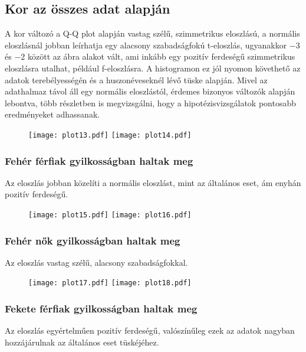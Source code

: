 \documentclass{article}
\begin{document}
\subsection{Kor az összes adat alapján}

A kor változó a Q-Q plot alapján vastag szélű, szimmetrikus eloszlású, a normális eloszlásnál jobban leírhatja egy alacsony szabadságfokú t-eloszlás, ugyanakkor $-3$ és $-2$ között az ábra alakot vált, ami inkább egy pozitív ferdeségű szimmetrikus eloszlásra utalhat, például f-eloszlásra. A histogramon ez jól nyomon követhető az adatok terebélyességén és a huszonéveseknél lévő tüske alapján. Mivel az adathalmaz távol áll egy normális eloszlástól, érdemes bizonyos változók alapján lebontva, több részletben is megvizsgálni, hogy a hipotézisvizsgálatok pontosabb eredményeket adhassanak.

\begin{figure}[h]
\texttt{[image: plot13.pdf]}
\texttt{[image: plot14.pdf]}
\end{figure}

\subsubsection{Fehér férfiak gyilkosságban haltak meg}

Az eloszlás jobban közelíti a normális eloszlást, mint az általános eset, ám enyhán pozitív ferdeségű.

\begin{figure}[!htb]
\texttt{[image: plot15.pdf]}
\texttt{[image: plot16.pdf]}
\end{figure}

\subsubsection{Fehér nők gyilkosságban haltak meg}

Az eloszlás vastag szélű, alacsony szabadságfokkal.

\begin{figure}[!htb]
\texttt{[image: plot17.pdf]}
\texttt{[image: plot18.pdf]}
\end{figure}

\subsubsection{Fekete férfiak gyilkosságban haltak meg}

Az eloszlás egyértelműen pozitív ferdeségű, valószínűleg ezek az adatok nagyban hozzájárulnak az általános eset tüskéjéhez.
\end{document}
